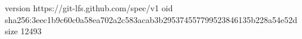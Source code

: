 version https://git-lfs.github.com/spec/v1
oid sha256:3eec1b9c60c0a58ea702a2c583acab3b295374557799523846135b228a54e52d
size 12493
